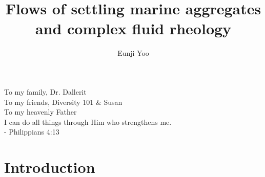\documentclass[11pt,oneside,chapterheads]{UCMerced}
\theoremstyle{plain}%
\theoremstyle{definition}
\begin{document}
\title{Flows of settling marine aggregates 
\\
and complex fluid rheology}
\author{Eunji Yoo}






\begin{frontmatter}
\makefrontmatter %

\tableofcontents
\listoffigures
\listoftables

\begin{dedication}
    To my family, Dr. Dallerit 
    \\
    To my friends, Diversity 101 \& Susan   
    \\
    To my heavenly Father 
    \\
    I can do all things through Him who strengthens me.
    \\
    \hspace{65mm} - Philippians 4:13 
\end{dedication}

\begin{acknowledgements} 
    
\end{acknowledgements}

% 

\begin{abstract}  
    
\end{abstract}

\end{frontmatter}

\chapter{Introduction}
\label{ch:intro}

\end{document}
